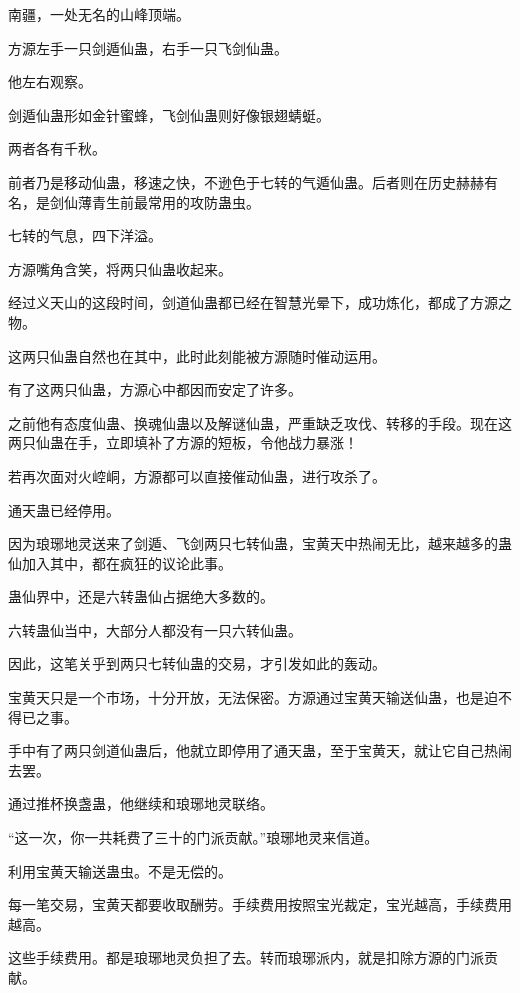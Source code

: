 
\begin{this_body}



南疆，一处无名的山峰顶端。

方源左手一只剑遁仙蛊，右手一只飞剑仙蛊。

他左右观察。

剑遁仙蛊形如金针蜜蜂，飞剑仙蛊则好像银翅蜻蜓。

两者各有千秋。

前者乃是移动仙蛊，移速之快，不逊色于七转的气遁仙蛊。后者则在历史赫赫有名，是剑仙薄青生前最常用的攻防蛊虫。

七转的气息，四下洋溢。

方源嘴角含笑，将两只仙蛊收起来。

经过义天山的这段时间，剑道仙蛊都已经在智慧光晕下，成功炼化，都成了方源之物。

这两只仙蛊自然也在其中，此时此刻能被方源随时催动运用。

有了这两只仙蛊，方源心中都因而安定了许多。

之前他有态度仙蛊、换魂仙蛊以及解谜仙蛊，严重缺乏攻伐、转移的手段。现在这两只仙蛊在手，立即填补了方源的短板，令他战力暴涨！

若再次面对火崆峒，方源都可以直接催动仙蛊，进行攻杀了。

通天蛊已经停用。

因为琅琊地灵送来了剑遁、飞剑两只七转仙蛊，宝黄天中热闹无比，越来越多的蛊仙加入其中，都在疯狂的议论此事。

蛊仙界中，还是六转蛊仙占据绝大多数的。

六转蛊仙当中，大部分人都没有一只六转仙蛊。

因此，这笔关乎到两只七转仙蛊的交易，才引发如此的轰动。

宝黄天只是一个市场，十分开放，无法保密。方源通过宝黄天输送仙蛊，也是迫不得已之事。

手中有了两只剑道仙蛊后，他就立即停用了通天蛊，至于宝黄天，就让它自己热闹去罢。

通过推杯换盏蛊，他继续和琅琊地灵联络。

“这一次，你一共耗费了三十的门派贡献。”琅琊地灵来信道。

利用宝黄天输送蛊虫。不是无偿的。

每一笔交易，宝黄天都要收取酬劳。手续费用按照宝光裁定，宝光越高，手续费用越高。

这些手续费用。都是琅琊地灵负担了去。转而琅琊派内，就是扣除方源的门派贡献。


\end{this_body}

